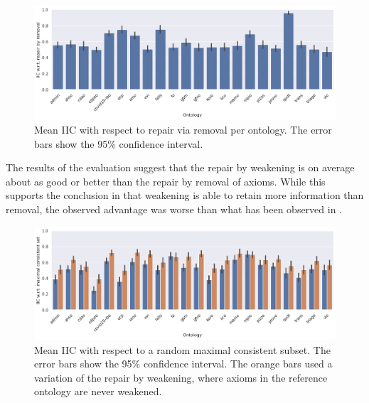 \begin{figure}[ht]
  \centering
  \includegraphics[width=\textwidth]{resources/iic-remove-ontology-bar.png}
  \caption{Mean IIC with respect to repair via removal per ontology. The error bars show the 95\% confidence interval.}
  \label{fig:results-remove}
\end{figure}

The results of the evaluation suggest that the repair by weakening is on average about as good or better than the repair by removal of axioms. While this supports the conclusion in \cite{troquard2018repairing} that weakening is able to retain more information than removal, the observed advantage was worse than what has been observed in \cite{troquard2018repairing}.

\begin{figure}[ht]
  \centering
  \includegraphics[width=\textwidth]{resources/iic-both-mcs-ontology-bar.png}
  \caption{Mean IIC with respect to a random maximal consistent subset. The error bars show the 95\% confidence interval. The orange bars used a variation of the repair by weakening, where axioms in the reference ontology are never weakened.}
  \label{fig:results-mcs}
\end{figure}

